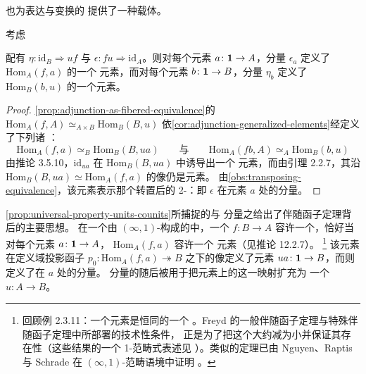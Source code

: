 \trCommaInfinityCategory{}也为表达\trUnit{}与\trCounit{}变换的%
\trUniversalProperty{}提供了一种载体。

\begin{proposition}[单位与余单位的泛性质]\label{prop:universal-property-units-counits}
考虑\trAdjunction
\begin{center}
\end{center}
配有\trUnit{} $\eta\colon\mathrm{id}_B\Rightarrow uf$ 与\trCounit{}
$\epsilon\colon fu\Rightarrow\mathrm{id}_A$。则对每个元素
$a\colon\mathbf{1}\to A$，分量 $\epsilon_a$ 定义了 $\mathrm{Hom}_A(f,a)$ 的一个%
\trTerminal{}元素，而对每个元素 $b\colon\mathbf{1}\to B$，分量 $\eta_b$ 定义了
$\mathrm{Hom}_B(b,u)$ 的一个\trInitial{}元素。
\end{proposition}

\begin{proof}
\cref{prop:adjunction-as-fibered-equivalence}的\trFiberedEquivalence{}
$\mathrm{Hom}_A(f,A)\simeq_{A\times B}\mathrm{Hom}_B(B,u)$
依\cref{cor:adjunction-generalized-elements}经\trPullback{}定义了下列诸%
\trEquivalence：
\[
\mathrm{Hom}_A(f,a)\simeq_{B}\mathrm{Hom}_B(B,ua)
\qquad\text{与}\qquad
\mathrm{Hom}_A(fb,A)\simeq_{A}\mathrm{Hom}_B(b,u)
\]
由推论 3.5.10，$\mathrm{id}_{ua}$ 在 $\mathrm{Hom}_B(B,ua)$ 中诱导出一个%
\trTerminal{}元素，而由引理 2.2.7，其沿\trEquivalence{}
$\mathrm{Hom}_B(B,ua)\simeq\mathrm{Hom}_A(f,a)$ 的像仍是\trTerminal{}元素。
由\cref{obs:transposing-equivalence}，该元素表示那个转置后的 2-\trCell：即%
\trCounit{} $\epsilon$ 在元素 $a$ 处的分量。
\end{proof}

\cref{prop:universal-property-units-counits}所捕捉的\trUnit{}与\trCounit{}%
分量之\trUniversalProperty{}给出了伴随函子定理背后的主要思想。
在一个由 $(\infty,1)$-\trCategory{}构成的\trInfinityCosmos{}中，一个%
\trFunctor{} $f\colon B\to A$ 容许一个\trRightAdjoint，恰好当对每个元素
$a\colon\mathbf{1}\to A$，\trInfinityCategory{} $\mathrm{Hom}_A(f,a)$ 容许一个%
\trTerminal{}元素（见推论 12.2.7）。
\footnote{回顾例 2.3.11：一个\trTerminal{}元素是恒同\trFunctor{}的一个%
\trColimit。Freyd 的一般伴随函子定理与特殊伴随函子定理中所部署的技术性条件，
正是为了把这个大\trColimit{}约减为小\trColimit{}并保证其存在性（这些结果的一个%
1-范畴式表述见 \cite[\S 4.6]{bib104}）。类似的定理已由 Nguyen、Raptis 与
Schrade 在 $(\infty,1)$-范畴语境中证明 \cite{bib88}。}
该\trTerminal{}元素在定义域投影函子
$p_0\colon\mathrm{Hom}_A(f,a)\twoheadrightarrow B$ 之下的像定义了元素
$ua\colon\mathbf{1}\to B$，而\trCommaCone{}则定义了\trCounit{}在 $a$ 处的分量。
\trCounit{}分量的\trUniversalProperty{}随后被用于把元素上的这一映射扩充为
一个\trFunctor{} $u\colon A\to B$。

